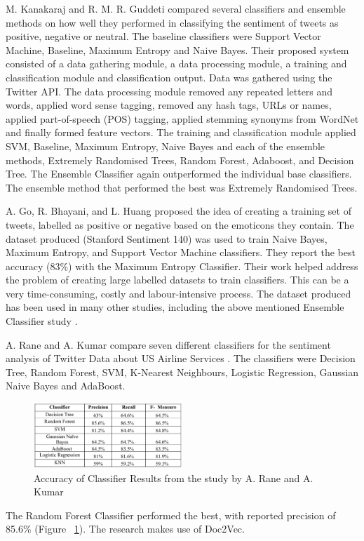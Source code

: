 M. Kanakaraj and R. M. R. Guddeti \cite{Kanakaraj2015} compared several classifiers and ensemble methods on how well they performed in classifying the sentiment of tweets as positive, negative or neutral. The baseline classifiers were Support Vector Machine, Baseline, Maximum Entropy and Naive Bayes. Their proposed system consisted of a data gathering module, a data processing module, a training and classification module and classification output. Data was gathered using the Twitter API. The data processing module removed any repeated letters and words, applied word sense tagging, removed any hash tags, URLs or names, applied part-of-speech (POS) tagging, applied stemming synonyms from WordNet and finally formed feature vectors. The training and classification module applied SVM, Baseline, Maximum Entropy, Naive Bayes and each of the ensemble methods, Extremely Randomised Trees, Random Forest, Adaboost, and Decision Tree. The Ensemble Classifier again outperformed the individual base classifiers. The ensemble method that performed the best was Extremely Randomised Trees. 

A. Go, R. Bhayani, and L. Huang \cite{Go2009} proposed the  idea of creating a training set of tweets, labelled as positive or negative based on the emoticons they contain. The dataset produced (Stanford Sentiment 140) was used to train Naive Bayes, Maximum Entropy, and Support Vector Machine classifiers. They report the best accuracy (83\%) with the Maximum Entropy Classifier. Their work helped address the problem of creating large labelled datasets to train classifiers. This can be a very time-consuming, costly and labour-intensive process. The dataset produced has been used in many other studies, including the above mentioned Ensemble Classifier study \cite{Ankit2018}.

A. Rane and A. Kumar compare seven different classifiers for the sentiment analysis of Twitter Data about US Airline Services \cite{Rane2018}. The classifiers were Decision Tree, Random Forest, SVM, K-Nearest Neighbours, Logistic Regression, Gaussian Naive Bayes and AdaBoost.
\begin{figure}
    \centering
    \setlength{\belowcaptionskip}{-10pt}
    \includegraphics[width=0.5\textwidth]{literature_review/arane_classifier_results.PNG}
    \caption{Accuracy of Classifier Results from the study by A. Rane and A. Kumar \cite{Rane2018}}
    \label{fig:arane}
\end{figure}
 The Random Forest Classifier performed the best, with reported precision of 85.6\% (Figure ~\ref{fig:arane}). The research makes use of Doc2Vec.

